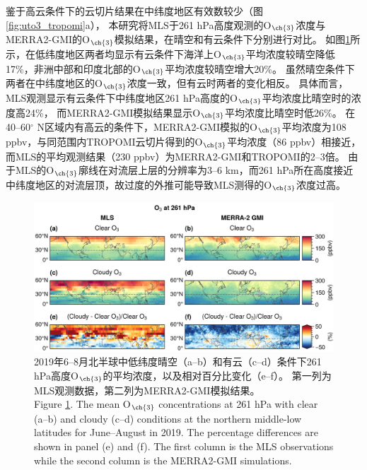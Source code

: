 鉴于高云条件下的云切片结果在中纬度地区有效数较少（图\ref{fig:uto3_tropomi}a），
本研究将MLS于261 hPa高度观测的O$_{\ch{3}}$浓度与MERRA2-GMI的O$_{\ch{3}}$模拟结果，在晴空和有云条件下分别进行对比。
如图\ref{fig:mls_o3_261hpa}所示，在低纬度地区两者均显示有云条件下海洋上O$_{\ch{3}}$平均浓度较晴空降低17\%，非洲中部和印度北部的O$_{\ch{3}}$平均浓度较晴空增大20\%。
虽然晴空条件下两者在中纬度地区的O$_{\ch{3}}$浓度一致，但有云时两者的变化相反。
具体而言，MLS观测显示有云条件下中纬度地区261 hPa高度的O$_{\ch{3}}$平均浓度比晴空时的浓度高24\%，
而MERRA2-GMI模拟结果显示O$_{\ch{3}}$平均浓度比晴空时低26\%。
在40--60$^{\circ}$ N区域内有高云的条件下，MERRA2-GMI模拟的O$_{\ch{3}}$平均浓度为108 ppbv，与同范围内TROPOMI云切片得到的O$_{\ch{3}}$平均浓度（86 ppbv）相接近，而MLS的平均观测结果（230 ppbv）为MERRA2-GMI和TROPOMI的2--3倍。
由于MLS的O$_{\ch{3}}$廓线在对流层上层的分辨率为3--6 km，而261 hPa所在高度接近中纬度地区的对流层顶，故过度的外推可能导致MLS测得的O$_{\ch{3}}$浓度过高\citep{Schoeberl.2007}。


\begin{figure}[H]
    \centering
    \includegraphics[width=\textwidth]{./figures/mls_o3_261hpa.png}
    \caption{
    2019年6--8月北半球中低纬度晴空（a--b）和有云（c--d）条件下261 hPa高度O$_{\ch{3}}$的平均浓度，以及相对百分比变化（e--f）。
    第一列为MLS观测数据，第二列为MERRA2-GMI模拟结果。 \\
    Figure \ref{fig:mls_o3_261hpa}. The mean O$_{\ch{3}}$ concentrations at 261 hPa with clear (a--b) and cloudy (c--d) conditions at the northern middle-low latitudes for June--August in 2019. The percentage differences are shown in panel (e) and (f).
    The first column is the MLS observations while the second column is the MERRA2-GMI simulations.
    }
    \label{fig:mls_o3_261hpa}
\end{figure}


